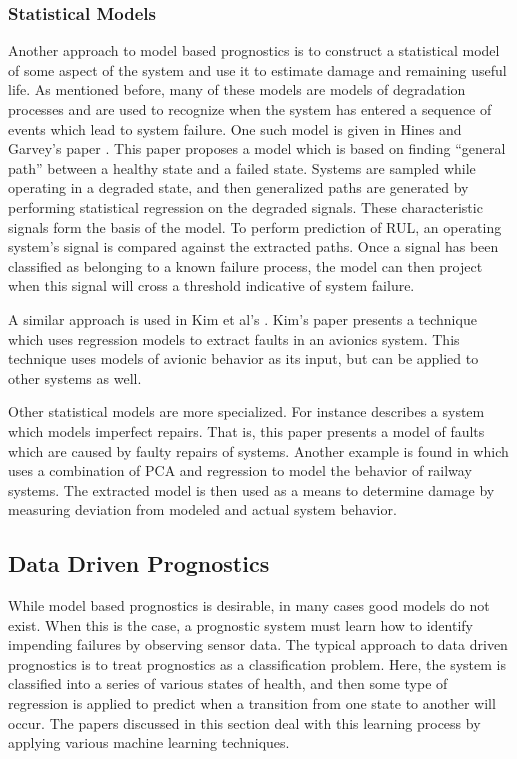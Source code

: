 \documentclass[12pt]{article}
\begin{document}
\subsubsection{Statistical Models}
Another approach to model based prognostics is to construct a statistical model
of some aspect of the system and use it to estimate damage and remaining useful
life.  As mentioned before, many of these models are models of degradation
processes and are used to recognize when the system has entered a sequence of
events which lead to system failure.  One such model is given in Hines and
Garvey's paper \cite{4925841}.  This paper proposes a model which is based on
finding ``general path'' between a healthy state and a failed state.  Systems
are sampled while operating in a degraded state, and then generalized paths are
generated by performing statistical regression on the degraded signals.  These
characteristic signals form the basis of the model.  To perform prediction of
RUL, an operating system's signal is compared against the extracted paths.
Once a signal has been classified as belonging to a known failure process, the
model can then project when this signal will cross a threshold indicative of
system failure.

A similar approach is used in Kim et al's \cite{5747564}. Kim's paper presents
a technique which uses regression models to extract faults in an avionics
system.  This technique uses models of avionic behavior as its input, but can
be applied to other systems as well. 

Other statistical models are more specialized.  For instance \cite{6228962}
describes a system which models imperfect repairs.  That is, this paper
presents a model of faults which are caused by faulty repairs of systems.
Another example is found in \cite{6299533} which uses a combination of PCA and
regression to model the behavior of railway systems.  The extracted model is
then used as a means to determine damage by measuring deviation from modeled
and actual system behavior.

\subsection{Data Driven Prognostics}
While model based prognostics is desirable, in many cases good models do not
exist. When this is the case, a prognostic system must learn how to identify
impending failures by observing sensor data. The typical approach to data
driven prognostics is to treat prognostics as a classification problem. Here,
the system is classified into a series of various states of health, and then
some type of regression is applied to predict when a transition from one state
to another will occur. The papers discussed in this section deal with this
learning process by applying various machine learning techniques.
\end{document}
